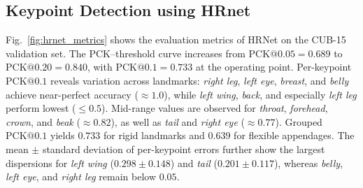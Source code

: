 \documentclass[final-report]{report-template}
\begin{document}
\subsection{Keypoint Detection using HRnet}



Fig.~\ref{fig:hrnet_metrics} shows the evaluation metrics of HRNet on the CUB-15 validation set. 
The PCK--threshold curve increases from $\text{PCK}@0.05 = 0.689$ to $\text{PCK}@0.20 = 0.840$, with $\text{PCK}@0.1 = 0.733$ at the operating point.  
Per-keypoint $\text{PCK}@0.1$ reveals variation across landmarks: \textit{right leg}, \textit{left eye}, \textit{breast}, and \textit{belly} achieve near-perfect accuracy ($\approx 1.0$), while \textit{left wing}, \textit{back}, and especially \textit{left leg} perform lowest ($\leq 0.5$). 
Mid-range values are observed for \textit{throat}, \textit{forehead}, \textit{crown}, and \textit{beak} ($\approx 0.82$), as well as \textit{tail} and \textit{right eye} ($\approx 0.77$).  
Grouped $\text{PCK}@0.1$ yields $0.733$ for rigid landmarks and $0.639$ for flexible appendages. 
The mean $\pm$ standard deviation of per-keypoint errors further show the largest dispersions for \textit{left wing} ($0.298 \pm 0.148$) and \textit{tail} ($0.201 \pm 0.117$), whereas \textit{belly}, \textit{left eye}, and \textit{right leg} remain below $0.05$.  
\end{document}
